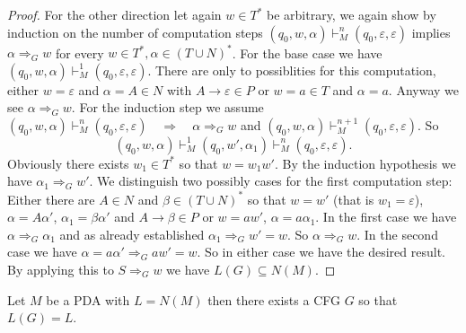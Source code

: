 \begin{proof}
  For the other direction let again $w\in T^*$ be arbitrary, we again show by induction
  on the number of computation steps $(q_0,w,\alpha)\vdash_M^n(q_0,\varepsilon,\varepsilon)$
  implies $\alpha \Rightarrow_G w$ for every $w\in T^*, \alpha \in (T\cup N)^*$.
  For the base case we have $(q_0,w,\alpha)\vdash_M^1(q_0,\varepsilon,\varepsilon)$. There
  are only to possiblities for this computation,
  either $w=\varepsilon$ and $\alpha = A\in N$ with $A\to\varepsilon\in P$ or $w=a\in T$
  and $\alpha=a$. Anyway we see $\alpha \Rightarrow_G w$. For the induction step
  we assume $(q_0,w,\alpha)\vdash_M^n(q_0,\varepsilon,\varepsilon)\quad\Longrightarrow \quad
  \alpha \Rightarrow_G w$ and $(q_0,w,\alpha)\vdash_M^{n+1}(q_0,\varepsilon,\varepsilon)$.
  So
  \[
    (q_0,w,\alpha)\vdash_M^1(q_0,w',\alpha_1)\vdash_M^n(q_0,\varepsilon,\varepsilon).
  \]
  Obviously there exists $w_1\in T^*$ so that $w=w_1w'$. By the induction hypothesis
  we have $\alpha_1 \Rightarrow_G w'$. We distinguish  two possibly cases for the first
  computation step: Either there are $A\in N$ and $\beta \in (T\cup N)^*$ so that
  $w=w'$ (that is $w_1=\varepsilon$), $\alpha=A\alpha'$,
  $\alpha_1=\beta\alpha'$ and $A\to\beta\in P$ or $w=aw'$, $\alpha=a\alpha_1$. In the first
  case we have $\alpha \Rightarrow_G \alpha_1$ and as already established
  $\alpha_1 \Rightarrow_G w'=w$. So $\alpha \Rightarrow_G w$. In the second case
  we have $\alpha = a \alpha' \Rightarrow_G a w' = w.$ So in either case we have the desired result.
  By applying this to $S\Rightarrow_G w$ we have $L(G)\subseteq N(M)$.


\end{proof}
\begin{theorem}\label{thm:CFG_of_PDA}
  Let $M$ be a PDA with $L=N(M)$ then there exists a CFG $G$ so that $L(G)=L.$
\end{theorem}
